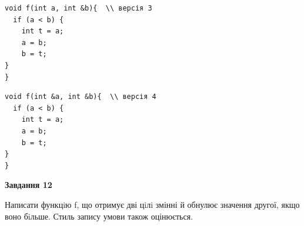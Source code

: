 \documentclass[12pt, ukrainian]{article}
\begin{document}
{\begin {large}
\begin{minipage}[t]{11.0cm}
\vspace{-8mm}\begin{verbatim}
void f(int a, int &b){  \\ версія 3
  if (a < b) {
    int t = a;
    a = b;
    b = t;
}  
}
\end{verbatim}

\vspace{-8mm}\begin{verbatim}
void f(int &a, int &b){  \\ версія 4
  if (a < b) {
    int t = a;
    a = b;
    b = t;
}  
}
\end{verbatim}



\begin{center}
\textbf{Завдання 12}
\end{center}

Написати функцiю f, що отримує дві цiлi змінні й обнулює значення другої, якщо воно бiльше. Стиль запису умови також оцінюється.\par

\end{minipage}

\end {large}}
\newpage
\end{document}
